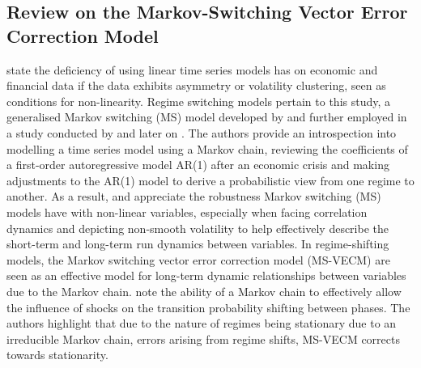 \documentclass[a4paper]{article}
\theoremstyle{plain}
\theoremstyle{definition}
\theoremstyle{remark}
\begin{document}
\subsection{Review on the Markov-Switching Vector Error Correction Model}
\cite{phoong2013markov} state the deficiency of using linear time series models has on economic and financial data if the data exhibits asymmetry or volatility clustering, seen as conditions for non-linearity. 
Regime switching models pertain to this study, a generalised Markov switching (MS) model developed by \cite{McCulloch1994} and further employed in a study conducted by \cite{hamilton2002new} and later on \cite{hamilton2013advances}. The authors provide an introspection into modelling a time series model using a Markov chain, reviewing the coefficients of a first-order autoregressive model AR(1) after an economic crisis and making adjustments to the AR(1) model to derive a probabilistic view from one regime to another.
As a result, \cite{shi2016nonlinear} and \cite{makatjane2024forecasting} appreciate the robustness Markov switching (MS) models have with non-linear variables, especially when facing correlation dynamics and depicting non-smooth volatility to help effectively describe the short-term and long-term run dynamics between variables.
\newline
In regime-shifting models, the Markov switching vector error correction model (MS-VECM) are seen as an effective model for long-term dynamic relationships between variables due to the Markov chain. \cite{phoong2014linear} note the ability of a Markov chain to effectively allow the influence of shocks on the transition probability shifting between phases. The authors highlight that due to the nature of regimes being stationary due to an irreducible Markov chain, errors arising from regime shifts, MS-VECM corrects towards stationarity.

\end{document}
